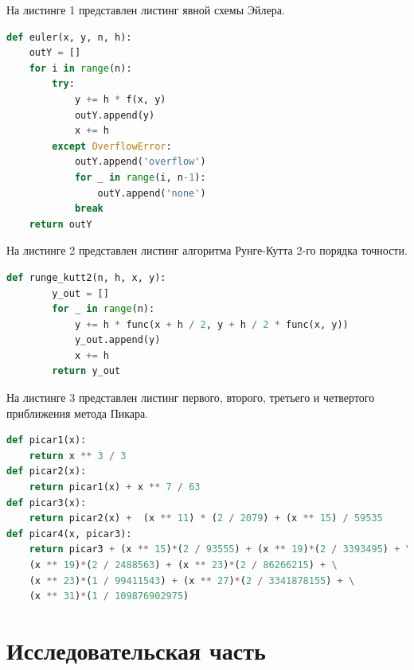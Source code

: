 \documentclass[a4paper, 12pt]{article}
\begin{document}
	\lstset{style=mystyle}

	\hspace*{-7mm} На листинге 1 представлен листинг явной схемы Эйлера.
	\begin{lstlisting}[language=Python, caption = явная схема Эйлера]
def euler(x, y, n, h):
	outY = []
	for i in range(n):
		try:
			y += h * f(x, y)
			outY.append(y)
			x += h
		except OverflowError:
			outY.append('overflow')
			for _ in range(i, n-1):
				outY.append('none')
			break
	return outY
	\end{lstlisting}

\hspace*{-7mm} На листинге 2 представлен листинг алгоритма Рунге-Кутта 2-го порядка точности.
\begin{lstlisting}[language=Python, caption = Рунге-Кутт 2-го порядка точности]
	def runge_kutt2(n, h, x, y):
		y_out = []
		for _ in range(n):
			y += h * func(x + h / 2, y + h / 2 * func(x, y))
			y_out.append(y)
			x += h
		return y_out
\end{lstlisting}
\clearpage
\newpage

\hspace*{-7mm} На листинге 3 представлен листинг первого, второго, третьего и четвертого приближения метода Пикара.
\begin{lstlisting}[language=Python]
def picar1(x):
	return x ** 3 / 3
def picar2(x):
	return picar1(x) + x ** 7 / 63
def picar3(x):
	return picar2(x) +  (x ** 11) * (2 / 2079) + (x ** 15) / 59535
def picar4(x, picar3):
	return picar3 + (x ** 15)*(2 / 93555) + (x ** 19)*(2 / 3393495) + \
	(x ** 19)*(2 / 2488563) + (x ** 23)*(2 / 86266215) + \
	(x ** 23)*(1 / 99411543) + (x ** 27)*(2 / 3341878155) + \
	(x ** 31)*(1 / 109876902975)
\end{lstlisting}	
\clearpage
\newpage
\section{Исследовательская часть }

	
\end{document}
